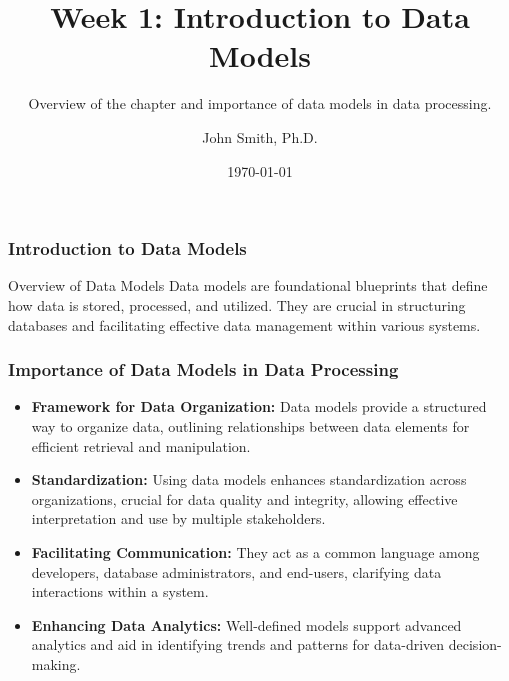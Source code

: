 \documentclass[aspectratio=169]{beamer}
\begin{document}
\frame{\titlepage}

\begin{frame}[fragile]
  \title{Week 1: Introduction to Data Models}
  \subtitle{Overview of the chapter and importance of data models in data processing.}
  \author{John Smith, Ph.D.}
  \date{\today}
  \maketitle
\end{frame}

\begin{frame}[fragile]
  \frametitle{Introduction to Data Models}
  \begin{block}{Overview of Data Models}
    Data models are foundational blueprints that define how data is stored, processed, and utilized. They are crucial in structuring databases and facilitating effective data management within various systems.
  \end{block}
\end{frame}

\begin{frame}[fragile]
  \frametitle{Importance of Data Models in Data Processing}
  \begin{itemize}
    \item \textbf{Framework for Data Organization:} 
    Data models provide a structured way to organize data, outlining relationships between data elements for efficient retrieval and manipulation.
    
    \item \textbf{Standardization:} 
    Using data models enhances standardization across organizations, crucial for data quality and integrity, allowing effective interpretation and use by multiple stakeholders.
    
    \item \textbf{Facilitating Communication:} 
    They act as a common language among developers, database administrators, and end-users, clarifying data interactions within a system.
    
    \item \textbf{Enhancing Data Analytics:} 
    Well-defined models support advanced analytics and aid in identifying trends and patterns for data-driven decision-making.
  \end{itemize}
\end{frame}
\end{document}

